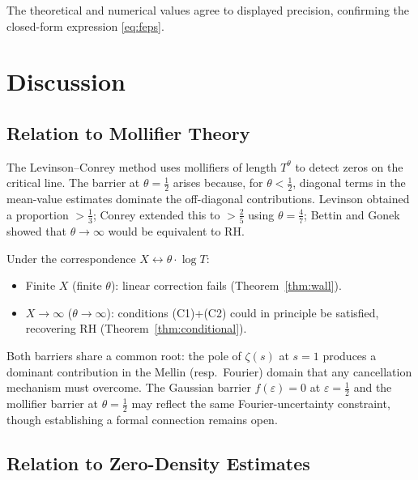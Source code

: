 \documentclass[12pt]{article}
\theoremstyle{remark}
\begin{document}
The theoretical and numerical values agree to displayed precision,
confirming the closed-form expression \eqref{eq:feps}.

\section{Discussion}\label{sec:discussion}

\subsection{Relation to Mollifier Theory}

The Levinson--Conrey method uses mollifiers of length $T^\theta$ to detect
zeros on the critical line. The barrier at $\theta = \tfrac{1}{2}$ arises
because, for $\theta < \tfrac{1}{2}$, diagonal terms in the mean-value
estimates dominate the off-diagonal contributions. Levinson \cite{Levinson1974}
obtained a proportion $> \tfrac{1}{3}$; Conrey \cite{Conrey1989} extended this
to $> \tfrac{2}{5}$ using $\theta = \tfrac{4}{7}$; Bettin and Gonek
\cite{BettinGonek2016} showed that $\theta \to \infty$ would be equivalent
to RH.

Under the correspondence $X \leftrightarrow \theta \cdot \log T$:
\begin{itemize}
\item Finite $X$ (finite $\theta$): linear correction fails
  (Theorem~\ref{thm:wall}).
\item $X \to \infty$ ($\theta \to \infty$): conditions (C1)+(C2) could in
  principle be satisfied, recovering RH (Theorem~\ref{thm:conditional}).
\end{itemize}

Both barriers share a common root: the pole of $\zeta(s)$ at $s=1$
produces a dominant contribution in the Mellin (resp.\ Fourier) domain
that any cancellation mechanism must overcome. The Gaussian barrier
$f(\varepsilon) = 0$ at $\varepsilon = \tfrac{1}{2}$ and the mollifier
barrier at $\theta = \tfrac{1}{2}$ may reflect the same Fourier-uncertainty
constraint, though establishing a formal connection remains open.

\subsection{Relation to Zero-Density Estimates}
\end{document}
